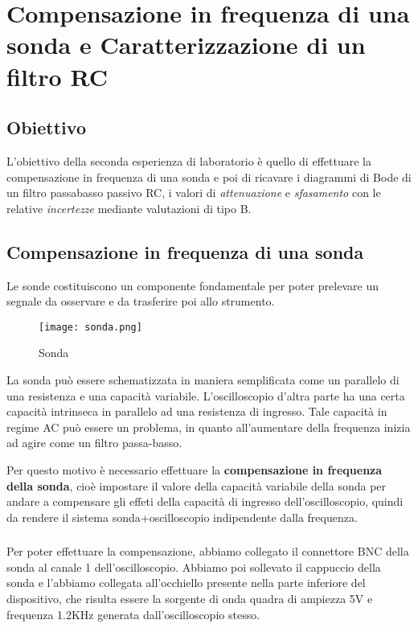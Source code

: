 \chapter{Compensazione in frequenza di una sonda  e Caratterizzazione di un filtro RC}
\label{chap:seconda_prova}

\section*{Obiettivo}
L'obiettivo della seconda esperienza di laboratorio è quello di effettuare la compensazione in frequenza di una sonda e poi di ricavare i diagrammi di Bode di un filtro passabasso passivo RC, i valori di \emph{attenuazione} e \emph{sfasamento} con le relative \emph{incertezze} mediante valutazioni di tipo B.

\section{Compensazione in frequenza di una sonda}
Le sonde costituiscono un componente fondamentale per poter prelevare un segnale da osservare e da trasferire poi allo strumento.

\begin{figure}[h]
    \centering
    \texttt{[image: sonda.png]}
    \caption{Sonda}
    \label{fig:sonda}
\end{figure}

La sonda può essere schematizzata in maniera semplificata come un parallelo di una resistenza e una capacità variabile. L'oscilloscopio d'altra parte ha una certa capacità intrinseca in parallelo ad una resistenza di ingresso. Tale capacità in regime AC può essere un problema, in quanto all'aumentare della frequenza inizia ad agire come un filtro passa-basso.

Per questo motivo è necessario effettuare la \textbf{compensazione in frequenza della sonda}, cioè impostare il valore della capacità variabile della sonda per andare a compensare gli effeti della capacità di ingresso dell'oscilloscopio, quindi da rendere il sistema sonda+oscilloscopio indipendente dalla frequenza.

\subsection*{}
Per poter effettuare la compensazione, abbiamo collegato il connettore BNC della sonda al canale 1 dell'oscilloscopio. Abbiamo poi sollevato il cappuccio della sonda e l'abbiamo collegata all'occhiello presente nella parte inferiore del dispositivo, che risulta essere la sorgente di onda quadra di ampiezza 5V e frequenza 1.2KHz generata dall'oscilloscopio stesso.

